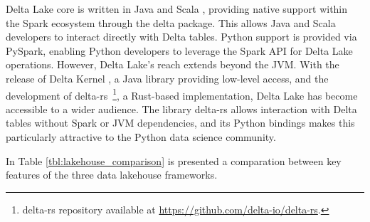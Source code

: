 Delta Lake  core is written in Java and Scala \cite{deltalake_tech_docs}, providing native support within the Spark ecosystem through the delta package. This allows Java and Scala developers to interact directly with Delta tables. Python support is provided via PySpark, enabling Python developers to leverage the Spark \gls{API} for Delta Lake operations.  However, Delta Lake's reach extends beyond the \gls{JVM}.  With the release of Delta Kernel \cite{AnnouncingDeltaLake2023}, a Java library providing low-level access, and the development of delta-rs~\footnote{delta-rs repository available at \url{https://github.com/delta-io/delta-rs}.}, a Rust-based implementation, Delta Lake has become accessible to a wider audience.  The library delta-rs allows interaction with Delta tables without Spark or \gls{JVM} dependencies, and its Python bindings makes this particularly attractive to the Python data science community.



\medspace
In Table \ref{tbl:lakehouse_comparison} is presented a comparation between key features of the three data lakehouse frameworks.